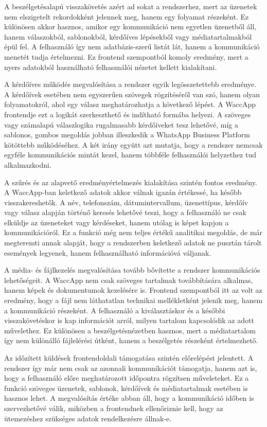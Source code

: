 A beszélgetésalapú visszakövetés azért ad sokat a rendszerhez, mert az üzenetek nem elszigetelt rekordokként jelennek meg, hanem egy folyamat részeként. Ez különösen akkor hasznos, amikor egy kommunikáció nem egyetlen üzenetből áll, hanem válaszokból, sablonokból, kérdőíves lépésekből vagy médiatartalmakból épül fel. A felhasználó így nem adatbázis-szerű listát lát, hanem a kommunikáció menetét tudja értelmezni. Ez frontend szempontból komoly eredmény, mert a nyers adatokból használható felhasználói nézetet kellett kialakítani.

A kérdőíves működés megvalósítása a rendszer egyik legösszetettebb eredménye. A kérdőívek esetében nem egyszerűen szövegek rögzítéséről van szó, hanem olyan folyamatokról, ahol egy válasz meghatározhatja a következő lépést. A WaccApp frontendje ezt a logikát szerkeszthető és indítható formába helyezi. A szöveges vagy számalapú válaszlogika rugalmasabb kérdőíveket tesz lehetővé, míg a sablonos, gombos megoldás jobban illeszkedik a WhatsApp Business Platform kötöttebb működéséhez. A két irány együtt azt mutatja, hogy a rendszer nemcsak egyféle kommunikációs mintát kezel, hanem többféle felhasználói helyzethez tud alkalmazkodni.

A szűrés és az alapvető eredményértelmezés kialakítása szintén fontos eredmény. A WaccApp-ban keletkező adatok akkor válnak igazán értékessé, ha később visszakereshetők. A név, telefonszám, dátumintervallum, üzenettípus, kérdőív vagy válasz alapján történő keresés lehetővé teszi, hogy a felhasználó ne csak elküldje az üzeneteket vagy kérdéseket, hanem utólag is képet kapjon a kommunikációról. Ez a funkció még nem teljes értékű analitikai megoldás, de már megteremti annak alapját, hogy a rendszerben keletkező adatok ne pusztán tárolt események legyenek, hanem felhasználható információvá váljanak.

A média- és fájlkezelés megvalósítása tovább bővítette a rendszer kommunikációs lehetőségeit. A WaccApp nem csak szöveges tartalmak továbbítására alkalmas, hanem képek és dokumentumok kezelésére is. Frontend szempontból itt az volt az eredmény, hogy a fájl nem láthatatlan technikai mellékletként jelenik meg, hanem a kommunikáció részeként. A felhasználó a kiválasztáskor és a későbbi visszakövetéskor is kap információt arról, milyen tartalom kapcsolódik az adott művelethez. Ez különösen a beszélgetésnézetben hasznos, mert a médiatartalom így nem különálló fájlelérési útként, hanem a beszélgetés részeként értelmezhető.

Az időzített küldések frontendoldali támogatása szintén előrelépést jelentett. A rendszer így már nem csak az azonnali kommunikációt támogatja, hanem azt is, hogy a felhasználó előre meghatározott időpontra rögzítsen műveleteket. Ez a funkció szöveges üzenetek, sablonok, kérdőívek és médiatartalmak esetében is hasznos lehet. A megvalósítás értéke abban áll, hogy a kommunikáció időben is szervezhetővé válik, miközben a frontendnek ellenőriznie kell, hogy az ütemezéshez szükséges adatok rendelkezésre állnak-e.

